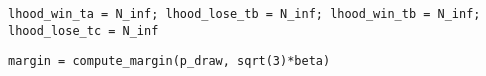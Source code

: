 \documentclass[article]{jss}
\newif\ifen
\newif\ifes
\newcommand{\en}[1]{\ifen#1\fi}
\newcommand{\es}[1]{\ifes#1\fi}
\begin{document}
\begin{lstlisting}[backgroundcolor=\color{all},belowskip=0.1cm]
lhood_win_ta = N_inf; lhood_lose_tb = N_inf; lhood_win_tb = N_inf; lhood_lose_tc = N_inf
\end{lstlisting}
%
\en{And we compute the margins for each comparison, $d_j$.}
\es{Y calculamos los margenes de cada comparaci\'on $d_j$.}
%
\en{Since there are three players in both comparisons, we adjust both margins with the same size.}
\es{Como en ambas comparaciones hay tres jugadores, ajustamos ambos margenes con ese mismo tamaño.}
%
\begin{lstlisting}[backgroundcolor=\color{all},belowskip=0.1cm]
margin = compute_margin(p_draw, sqrt(3)*beta)
\end{lstlisting}

\end{document}
